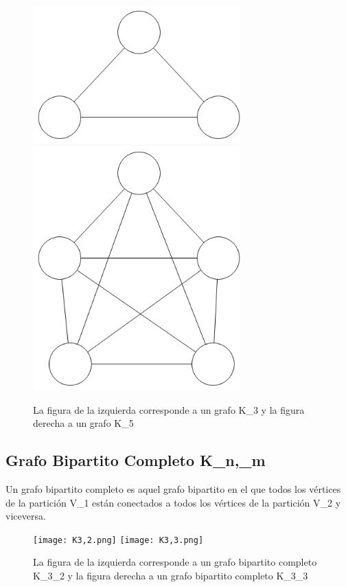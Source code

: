 \begin{figure}[H]
\includegraphics[width=80mm]{K3.png}
\includegraphics[width=80mm]{K5.png}
\caption{La figura de la izquierda corresponde a un grafo K_3 y la figura derecha a un grafo K_5}
\label{overflow}
\end{figure}

\subsection{Grafo Bipartito Completo K_n,_m}
Un grafo bipartito completo es aquel grafo bipartito en el que todos los vértices de la partición V_1 están conectados a todos los vértices de la partición V_2 y viceversa.

\begin{figure}[H]
\texttt{[image: K3,2.png]}
\texttt{[image: K3,3.png]}
\caption{La figura de la izquierda corresponde a un grafo bipartito completo K_3_2 y la figura derecha a un grafo bipartito completo K_3_3}
\label{overflow}
\end{figure}
